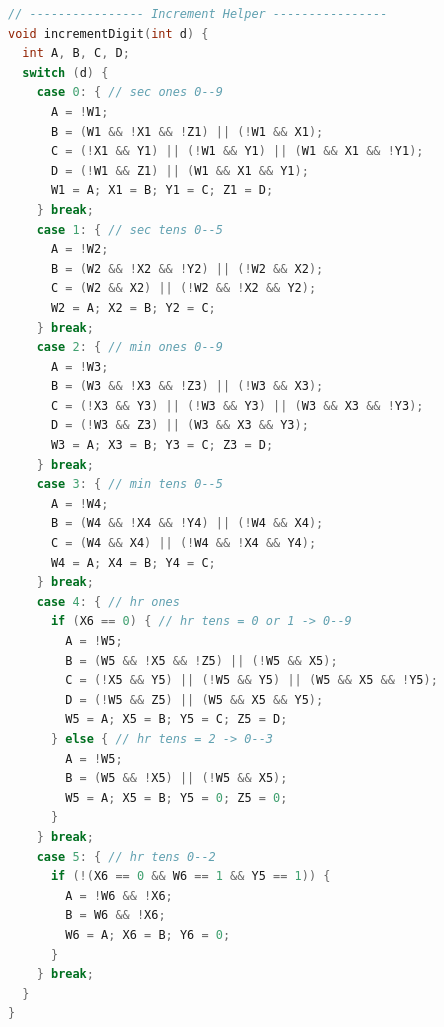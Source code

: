 \documentclass[11pt,a4paper]{article}
\begin{document}
\begin{lstlisting}[language=C]
// ---------------- Increment Helper ----------------
void incrementDigit(int d) {
  int A, B, C, D;
  switch (d) {
    case 0: { // sec ones 0--9
      A = !W1;
      B = (W1 && !X1 && !Z1) || (!W1 && X1);
      C = (!X1 && Y1) || (!W1 && Y1) || (W1 && X1 && !Y1);
      D = (!W1 && Z1) || (W1 && X1 && Y1);
      W1 = A; X1 = B; Y1 = C; Z1 = D;
    } break;
    case 1: { // sec tens 0--5
      A = !W2;
      B = (W2 && !X2 && !Y2) || (!W2 && X2);
      C = (W2 && X2) || (!W2 && !X2 && Y2);
      W2 = A; X2 = B; Y2 = C;
    } break;
    case 2: { // min ones 0--9
      A = !W3;
      B = (W3 && !X3 && !Z3) || (!W3 && X3);
      C = (!X3 && Y3) || (!W3 && Y3) || (W3 && X3 && !Y3);
      D = (!W3 && Z3) || (W3 && X3 && Y3);
      W3 = A; X3 = B; Y3 = C; Z3 = D;
    } break;
    case 3: { // min tens 0--5
      A = !W4;
      B = (W4 && !X4 && !Y4) || (!W4 && X4);
      C = (W4 && X4) || (!W4 && !X4 && Y4);
      W4 = A; X4 = B; Y4 = C;
    } break;
    case 4: { // hr ones
      if (X6 == 0) { // hr tens = 0 or 1 -> 0--9
        A = !W5;
        B = (W5 && !X5 && !Z5) || (!W5 && X5);
        C = (!X5 && Y5) || (!W5 && Y5) || (W5 && X5 && !Y5);
        D = (!W5 && Z5) || (W5 && X5 && Y5);
        W5 = A; X5 = B; Y5 = C; Z5 = D;
      } else { // hr tens = 2 -> 0--3
        A = !W5;
        B = (W5 && !X5) || (!W5 && X5);
        W5 = A; X5 = B; Y5 = 0; Z5 = 0;
      }
    } break;
    case 5: { // hr tens 0--2
      if (!(X6 == 0 && W6 == 1 && Y5 == 1)) {
        A = !W6 && !X6;
        B = W6 && !X6;
        W6 = A; X6 = B; Y6 = 0;
      }
    } break;
  }
}


\end{lstlisting}
\end{document}

